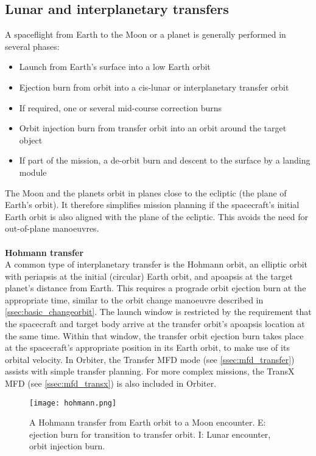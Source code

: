 \documentclass[Orbiter User Manual.tex]{subfiles}
\begin{document}
\subsection{Lunar and interplanetary transfers}
A spaceflight from Earth to the Moon or a planet is generally performed in several phases:

\begin{itemize}
\item Launch from Earth's surface into a low Earth orbit
\item Ejection burn from orbit into a cis-lunar or interplanetary transfer orbit
\item If required, one or several mid-course correction burns
\item Orbit injection burn from transfer orbit into an orbit around the target object
\item If part of the mission, a de-orbit burn and descent to the surface by a landing module
\end{itemize}

\noindent
The Moon and the planets orbit in planes close to the ecliptic (the plane of Earth's orbit). It therefore simplifies mission planning if the spacecraft's initial Earth orbit is also aligned with the plane of the ecliptic. This avoids the need for out-of-plane manoeuvres.\\
\\
\textbf{Hohmann transfer}\\
A common type of interplanetary transfer is the Hohmann orbit, an elliptic orbit with periapsis at the initial (circular) Earth orbit, and apoapsis at the target planet's distance from Earth. This requires a prograde orbit ejection burn at the appropriate time, similar to the orbit change manoeuvre described in \ref{ssec:basic_changeorbit}. The launch window is restricted by the requirement that the spacecraft and target body arrive at the transfer orbit's apoapsis location at the same time. Within that window, the transfer orbit ejection burn takes place at the spacecraft's appropriate position in its Earth orbit, to make use of its orbital velocity. In Orbiter, the Transfer MFD mode (see \ref{ssec:mfd_transfer}) assists with simple transfer planning. For more complex missions, the TransX MFD (see \ref{ssec:mfd_transx}) is also included in Orbiter.


\begin{figure}[H]
	\centering
	\texttt{[image: hohmann.png]}
	\caption{A Hohmann transfer from Earth orbit to a Moon encounter. E: ejection burn for transition to transfer orbit. I: Lunar encounter, orbit injection burn.}
\end{figure}
\end{document}
